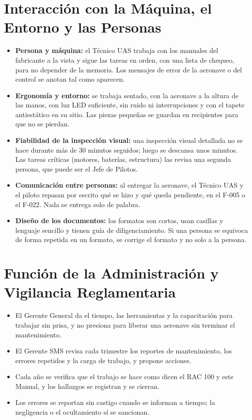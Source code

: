 \section{Interacción con la Máquina, el Entorno y las Personas}
\begin{itemize}
    \item \textbf{Persona y máquina:} el Técnico UAS trabaja con los manuales del fabricante a la vista y sigue las tareas en orden, con una lista de chequeo, para no depender de la memoria. Los mensajes de error de la aeronave o del control se anotan tal como aparecen.
    \item \textbf{Ergonomía y entorno:} se trabaja sentado, con la aeronave a la altura de las manos, con luz LED suficiente, sin ruido ni interrupciones y con el tapete antiestático en su sitio. Las piezas pequeñas se guardan en recipientes para que no se pierdan.
    \item \textbf{Fiabilidad de la inspección visual:} una inspección visual detallada no se hace durante más de 30 minutos seguidos; luego se descansa unos minutos. Las tareas críticas (motores, baterías, estructura) las revisa una segunda persona, que puede ser el Jefe de Pilotos.
    \item \textbf{Comunicación entre personas:} al entregar la aeronave, el Técnico UAS y el piloto repasan por escrito qué se hizo y qué queda pendiente, en el F-005 o el F-022. Nada se entrega solo de palabra.
    \item \textbf{Diseño de los documentos:} los formatos son cortos, usan casillas y lenguaje sencillo y tienen guía de diligenciamiento. Si una persona se equivoca de forma repetida en un formato, se corrige el formato y no solo a la persona.
\end{itemize}

\section{Función de la Administración y Vigilancia Reglamentaria}
\begin{itemize}
    \item El Gerente General da el tiempo, las herramientas y la capacitación para trabajar sin prisa, y no presiona para liberar una aeronave sin terminar el mantenimiento.
    \item El Gerente SMS revisa cada trimestre los reportes de mantenimiento, los errores repetidos y la carga de trabajo, y propone acciones.
    \item Cada año se verifica que el trabajo se hace como dicen el RAC 100 y este Manual, y los hallazgos se registran y se cierran.
    \item Los errores se reportan sin castigo cuando se informan a tiempo; la negligencia o el ocultamiento sí se sancionan.
\end{itemize}

